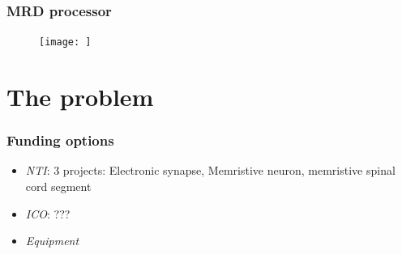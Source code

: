 \documentclass[12pt, aspectratio=169]{beamer}
\begin{document}
\begin{frame}
  \frametitle{MRD processor}
  
\begin{figure}
\texttt{[image: ]}
\end{figure}

\end{frame}


\section{The problem} 
\begin{frame}
\frametitle{Funding options}
\begin{itemize}
\item \emph{NTI}: 3 projects: Electronic synapse, Memristive neuron, memristive spinal cord segment
\item \emph{ICO}: ???
\item \emph{Equipment}
\end{itemize}
\end{frame}
\end{document}

